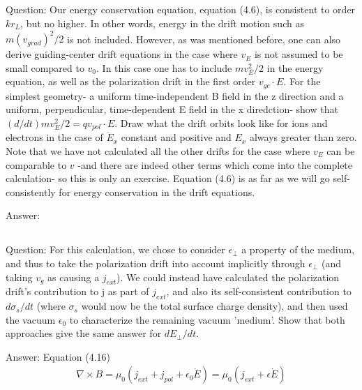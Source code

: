 \documentclass{article}
\begin{document}
\subsection{}
Question: Our energy conservation equation, equation (4.6), is consistent to order $kr_L$, but no higher.
In other words, energy in the drift motion such as $m(v_{grad})^2/2$ is not included.
However, as was mentioned before, one can also derive guiding-center drift equations in the case where $v_E$ is not assumed to be small compared to $v_0$. 
In this case one has to include $mv_E^2/2$ in the energy equation, as well as the polarization drift in the first order $v_{gc}\cdot E$. 
For the simplest geometry- a uniform time-independent B field in the z direction and a uniform, perpendicular, time-dependent E field in the x diredction-
show that $(d/dt)mv_E^2/2=qv_{pol}\cdot E$.
Draw what the drift orbits look like for ions and electrons in the case of $\dot{E}_x$ constant and positive and $E_x$ always greater than zero.
Note that we have not calculated all the other drifts for the case where $v_E$ can be comparable to $v$ -and there are indeed other terms which come into the complete calculation-
so this is only an exercise. Equation (4.6) is as far as we will go self-consistently for energy conservation in the drift equations.

Answer:

\subsection{}
Question: For this calculation, we chose to consider $\epsilon_\perp$ a property of the medium, and thus to take the polarization drift into account implicitly through $\epsilon_\perp$ 
(and taking $v_g$ as causing a $j_{ext}$). 
We could instead have calculated the polarization drift's contribution to j as part of $j_{ext}$, and also its self-consistent contribution to $d\sigma_s/dt$ (where $\sigma_s$ would now be the total surface charge density),
and then used the vacuum $\epsilon_0$ to characterize the remaining vacuum 'medium'.
Show that both approaches give the same answer for $dE_\perp/dt$.

Answer:
Equation (4.16)
\begin{eqnarray*}
    \nabla \times B=\mu_0(j_{ext}+j_{pol}+\epsilon_0\dot{E})=\mu_0(j_{ext}+\epsilon\dot{E})
\end{eqnarray*}



\end{document}
